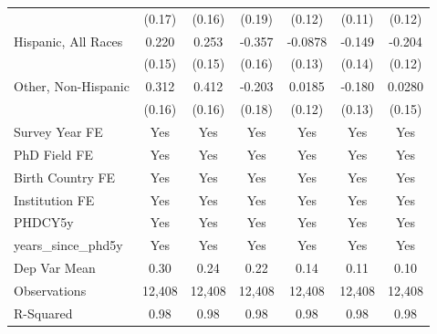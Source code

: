 \begin{table}[htbp]
\begin{tabular}{l*{6}{c}}
  &      (0.17)         &      (0.16)         &      (0.19)         &      (0.12)         &      (0.11)         &      (0.12)         \\
[1em]
Hispanic, All Races&       0.220         &       0.253         &      -0.357\sym{**} &     -0.0878         &      -0.149         &      -0.204\sym{*}  \\
  &      (0.15)         &      (0.15)         &      (0.16)         &      (0.13)         &      (0.14)         &      (0.12)         \\
[1em]
Other, Non-Hispanic&       0.312\sym{*}  &       0.412\sym{***}&      -0.203         &      0.0185         &      -0.180         &      0.0280         \\
  &      (0.16)         &      (0.16)         &      (0.18)         &      (0.12)         &      (0.13)         &      (0.15)         \\
[1em]
Survey Year FE&         Yes         &         Yes         &         Yes         &         Yes         &         Yes         &         Yes         \\
[1em]
PhD Field FE&         Yes         &         Yes         &         Yes         &         Yes         &         Yes         &         Yes         \\
[1em]
Birth Country FE&         Yes         &         Yes         &         Yes         &         Yes         &         Yes         &         Yes         \\
[1em]
Institution FE&         Yes         &         Yes         &         Yes         &         Yes         &         Yes         &         Yes         \\
[1em]
PHDCY5y&         Yes         &         Yes         &         Yes         &         Yes         &         Yes         &         Yes         \\
[1em]
years\_since\_phd5y&         Yes         &         Yes         &         Yes         &         Yes         &         Yes         &         Yes         \\
\hline
Dep Var Mean&        0.30         &        0.24         &        0.22         &        0.14         &        0.11         &        0.10         \\
Observations&      12,408         &      12,408         &      12,408         &      12,408         &      12,408         &      12,408         \\
R-Squared&        0.98         &        0.98         &        0.98         &        0.98         &        0.98         &        0.98         \\

\end{tabular}
\end{table}
